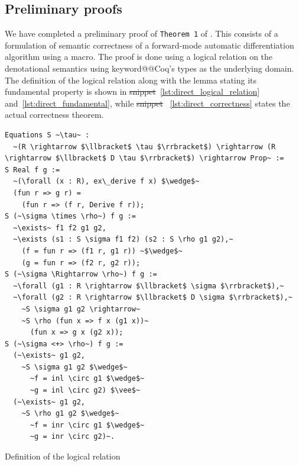 \documentclass[12pt, final]{article}
\makeatletter
\def\<#1>{\csname keyword@@#1\endcsname}
\providecommand{\DIFaddtex}[1]{{\protect\color{blue}\uwave{#1}}} %
\providecommand{\DIFdeltex}[1]{{\protect\color{red}\sout{#1}}}                      %
\providecommand{\DIFaddbegin}{} %
\providecommand{\DIFaddend}{} %
\providecommand{\DIFdelbegin}{} %
\providecommand{\DIFdelend}{} %
\providecommand{\DIFadd}[1]{\texorpdfstring{\DIFaddtex{#1}}{#1}} %
\providecommand{\DIFdel}[1]{\texorpdfstring{\DIFdeltex{#1}}{}} %
\newcommand{\DIFscaledelfig}{0.5}
\newlength{\DIFdelgraphicswidth} %
\newlength{\DIFdelgraphicsheight} %
\newcommand{\DIFaddincludegraphics}[2][]{{\color{blue}\fbox{\DIFOincludegraphics[#1]{#2}}}} %
\newcommand{\DIFdelincludegraphics}[2][]{%
\sbox{\DIFdelgraphicsbox}{\DIFOincludegraphics[#1]{#2}}%
\settoboxwidth{\DIFdelgraphicswidth}{\DIFdelgraphicsbox} %
\settoboxtotalheight{\DIFdelgraphicsheight}{\DIFdelgraphicsbox} %
\scalebox{\DIFscaledelfig}{%
\parbox[b]{\DIFdelgraphicswidth}{\usebox{\DIFdelgraphicsbox}\\[-\baselineskip] \rule{\DIFdelgraphicswidth}{0em}}\llap{\resizebox{\DIFdelgraphicswidth}{\DIFdelgraphicsheight}{%
\setlength{\unitlength}{\DIFdelgraphicswidth}%
\begin{picture}(1,1)%
\thicklines\linethickness{2pt} %
{\color[rgb]{1,0,0}\put(0,0){\framebox(1,1){}}}%
{\color[rgb]{1,0,0}\put(0,0){\line( 1,1){1}}}%
{\color[rgb]{1,0,0}\put(0,1){\line(1,-1){1}}}%
\end{picture}%
}\hspace*{3pt}}} %
} %
\DeclareRobustCommand{\DIFaddbegin}{\DIFOaddbegin \let\includegraphics\DIFaddincludegraphics} %
\DeclareRobustCommand{\DIFaddend}{\DIFOaddend \let\includegraphics\DIFOincludegraphics} %
\DeclareRobustCommand{\DIFdelbegin}{\DIFOdelbegin \let\includegraphics\DIFdelincludegraphics} %
\DeclareRobustCommand{\DIFdelend}{\DIFOaddend \let\includegraphics\DIFOincludegraphics} %
\makeatother
\begin{document}
\subsection{Preliminary proofs}

We have completed a preliminary proof of \texttt{Theorem 1} of \cite{huot2020correctness}. This consists of a formulation of semantic correctness of a forward-mode automatic differentiation algorithm using a macro. The proof is done using a logical relation on the denotational semantics using \<Coq>'s types as the underlying domain. The definition of the logical relation along with the lemma stating its fundamental property is shown in \DIFdelbegin \DIFdel{snippet}\DIFdelend \DIFaddbegin \DIFadd{Snippet}\DIFaddend ~\ref{lst:direct_logical_relation} and~\ref{lst:direct_fundamental}, while \DIFdelbegin \DIFdel{snippet}\DIFdelend \DIFaddbegin \DIFadd{Snippet}\DIFaddend ~ \ref{lst:direct_correctness} states the actual correctness theorem.

\begin{listing}
  \begin{verbatim}
Equations S ~\tau~ :
  ~(R \rightarrow $\llbracket$ \tau $\rrbracket$) \rightarrow (R \rightarrow $\llbracket$ D \tau $\rrbracket$) \rightarrow Prop~ :=
S Real f g :=
  ~(\forall (x : R), ex\_derive f x) $\wedge$~
  (fun r => g r) =
    (fun r => (f r, Derive f r));
S (~\sigma \times \rho~) f g :=
  ~\exists~ f1 f2 g1 g2,
  ~\exists (s1 : S \sigma f1 f2) (s2 : S \rho g1 g2),~
    (f = fun r => (f1 r, g1 r)) ~$\wedge$~
    (g = fun r => (f2 r, g2 r));
S (~\sigma \Rightarrow \rho~) f g :=
  ~\forall (g1 : R \rightarrow $\llbracket$ \sigma $\rrbracket$),~
  ~\forall (g2 : R \rightarrow $\llbracket$ D \sigma $\rrbracket$),~
    ~S \sigma g1 g2 \rightarrow~
    ~S \rho (fun x => f x (g1 x))~
      (fun x => g x (g2 x));
S (~\sigma <+> \rho~) f g :=
  (~\exists~ g1 g2,
    ~S \sigma g1 g2 $\wedge$~
      ~f = inl \circ g1 $\wedge$~
      ~g = inl \circ g2) $\vee$~
  (~\exists~ g1 g2,
    ~S \rho g1 g2 $\wedge$~
      ~f = inr \circ g1 $\wedge$~
      ~g = inr \circ g2)~.
  \end{verbatim}
  \caption{Definition of the logical relation}
  \label{lst:direct_logical_relation}
\end{listing}
\end{document}
